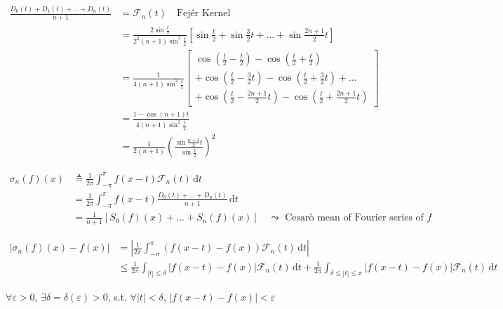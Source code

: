 \begin{align*}
    \frac{D_0(t)+D_1(t)+\dots+D_n(t)}{n+1}
     & =\mathcal{F}_n(t)\quad\text{Fejér Kernel}                                                                                           \\
     & =\frac{2\sin\frac{t}{2}}{2^2(n+1)\sin^2\frac{t}{2}}\left[\sin\frac{t}{2}+\sin\frac{3}{2}t+\dots+\sin\frac{2n+1}{2}t\right]          \\
     & =\frac{1}{4(n+1)\sin^2\frac{t}{2}}\left[\substack{\cos\left(\frac{t}{2}-\frac{t}{2}\right)-\cos\left(\frac{t}{2}+\frac{t}{2}\right) \\
    +\cos\left(\frac{t}{2}-\frac{3}{2}t\right)-\cos\left(\frac{t}{2}+\frac{3}{2}t\right)+\dots                                             \\
    +\cos\left(\frac{t}{2}-\frac{2n+1}{2}t\right)-\cos\left(\frac{t}{2}+\frac{2n+1}{2}t\right)}\right]                                     \\
     & =\frac{1-\cos(n+1)t}{4(n+1)\sin^2\frac{t}{2}}                                                                                       \\
     & =\frac{1}{2(n+1)}\left(\frac{\sin\frac{n+1}{2}t}{\sin\frac{t}{2}}\right)^2
\end{align*}

\begin{align*}
    \sigma_n(f)(x)
     & \triangleq\frac{1}{2\pi}\int_{-\pi}^{\pi}f(x-t)\mathcal{F}_n(t)\,\mathrm{d}t                                  \\
     & =\frac{1}{2\pi}\int_{-\pi}^{\pi}f(x-t)\frac{D_0(t)+\dots+D_n(t)}{n+1}\,\mathrm{d}t                            \\
     & =\frac{1}{n+1}\left[S_0(f)(x)+\dots+S_n(f)(x)\right]\quad\leadsto\text{ Cesarò mean of Fourier series of $f$}
\end{align*}

\begin{align*}
    \left|\sigma_n(f)(x)-f(x)\right|
     & =\left|\frac{1}{2\pi}\int_{-\pi}^{\pi}\left(f(x-t)-f(x)\right)\mathcal{F}_n(t)\,\mathrm{d}t\right|                                                                                         \\
     & \leq\frac{1}{2\pi}\int_{|t|\leq\delta}\left|f(x-t)-f(x)\right|\mathcal{F}_n(t)\,\mathrm{d}t+\frac{1}{2\pi}\int_{\delta\leq|t|\leq\pi}\left|f(x-t)-f(x)\right|\mathcal{F}_n(t)\,\mathrm{d}t
\end{align*}

$\forall\varepsilon>0$, $\exists\delta=\delta(\varepsilon)>0$, s.t. $\forall|t|<\delta$, $\left|f(x-t)-f(x)\right|<\varepsilon$

